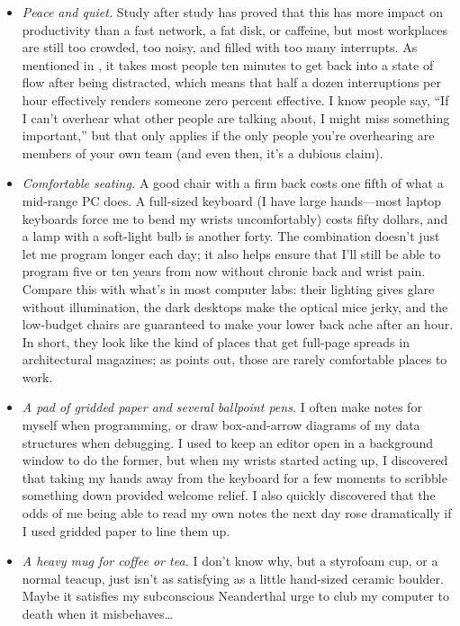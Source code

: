 \documentclass{report}
\begin{document}
\begin{itemize}

  \item \emph{Peace and quiet.} Study after study has proved that this
  has more impact on productivity than a fast network, a fat disk, or
  caffeine, but most workplaces are still too crowded, too noisy, and
  filled with too many interrupts.  As mentioned in
  , it takes most people ten minutes to get
  back into a state of flow after being distracted, which means that
  half a dozen interruptions per hour effectively renders someone zero
  percent effective.  I know people say, ``If I can't overhear what
  other people are talking about, I might miss something important,''
  but that only applies if the only people you're overhearing are
  members of your own team (and even then, it's a dubious claim).

  \item \emph{Comfortable seating.} A good chair with a firm back
  costs one fifth of what a mid-range PC does.  A full-sized keyboard
  (I have large hands---most laptop keyboards force me to bend my
  wrists uncomfortably) costs fifty dollars, and a lamp with a
  soft-light bulb is another forty.  The combination doesn't just let
  me program longer each day; it also helps ensure that I'll still be
  able to program five or ten years from now without chronic back and
  wrist pain.  Compare this with what's in most computer labs: their
  lighting gives glare without illumination, the dark desktops make
  the optical mice jerky, and the low-budget chairs are guaranteed to
  make your lower back ache after an hour.  In short, they look like
  the kind of places that get full-page spreads in architectural
  magazines; as \cite{b:brand-how-buildings-learn} points out, those
  are rarely comfortable places to work.

  \item \emph{A pad of gridded paper and several ballpoint pens.}  I
  often make notes for myself when programming, or draw box-and-arrow
  diagrams of my data structures when debugging.  I used to keep an
  editor open in a background window to do the former, but when my
  wrists started acting up, I discovered that taking my hands away
  from the keyboard for a few moments to scribble something down
  provided welcome relief.  I also quickly discovered that the odds of
  me being able to read my own notes the next day rose dramatically if
  I used gridded paper to line them up.

  \item \emph{A heavy mug for coffee or tea.} I don't know why, but a
  styrofoam cup, or a normal teacup, just isn't as satisfying as a
  little hand-sized ceramic boulder.  Maybe it satisfies my
  subconscious Neanderthal urge to club my computer to death when it
  misbehaves{\ldots}


\end{itemize}
\end{document}
